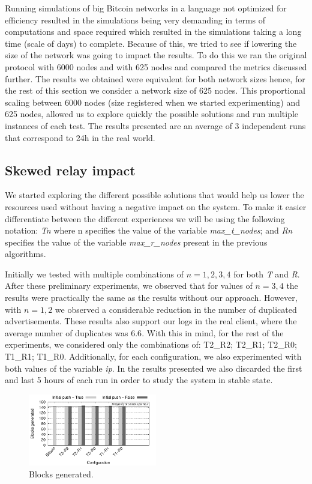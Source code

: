 \documentclass{dads}   %
\begin{document}
Running simulations of big Bitcoin networks in a language not optimized for efficiency resulted in the simulations being very demanding in terms of computations and space required which resulted in the simulations taking a long time (scale of days) to complete. Because of this, we tried to see if lowering the size of the network was going to impact the results. To do this we ran the original protocol with 6000 nodes and with 625 nodes and compared the metrics discussed further. The results we obtained were equivalent for both network sizes hence, for the rest of this section we consider a network size of 625 nodes. This proportional scaling between 6000 nodes (size registered when we started experimenting) and 625 nodes, allowed us to explore quickly the possible solutions and run multiple instances of each test. The results presented are an average of 3 independent runs that correspond to 24h in the real world.


\subsection{Skewed relay impact}
We started exploring the different possible solutions that would help us lower the resources used without having a negative impact on the system. To make it easier differentiate between the different experiences we will be using the following notation: \textsl{Tn} where n specifies the value of the variable \textsl{max\_t\_nodes}; and \textsl{Rn} specifies the value of the variable \textsl{max\_r\_nodes} present in the previous algorithms.

Initially we tested with multiple combinations of $n={1,2,3,4}$ for both \textsl{T} and \textsl{R}. After these preliminary experiments, we observed that for values of $n={3,4}$ the results were practically the same as the results without our approach. However, with $n={1,2}$ we observed a considerable reduction in the number of duplicated advertisements.
These results also support our logs in the real client, where the average number of duplicates was $6.6$. With this in mind, for the rest of the experiments, we considered only the combinations of: T2\_R2; T2\_R1; T2\_R0; T1\_R1; T1\_R0. Additionally, for each configuration, we also experimented with both values of the variable \textsl{ip}. In the results presented we also discarded the first and last 5 hours of each run in order to study the system in stable state.

\begin{figure}
\centering
\includegraphics[width=0.5\textwidth]{plots/blocks-gen.pdf}
\caption{Blocks generated.}
\label{fig:nb-blocks}
\end{figure}
\end{document}
